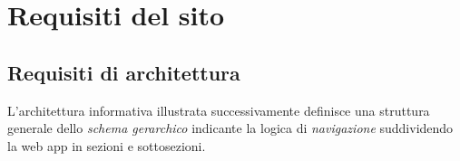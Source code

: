 
\chapter{Requisiti del sito}\label{chap:requisiti-del-sito}

\section{Requisiti di architettura}\label{sec:requisiti-di-architettura}

L'architettura informativa illustrata successivamente definisce una struttura 
generale dello \textit{schema gerarchico} indicante la logica di 
\textit{navigazione} suddividendo la web app in sezioni e sottosezioni. 

